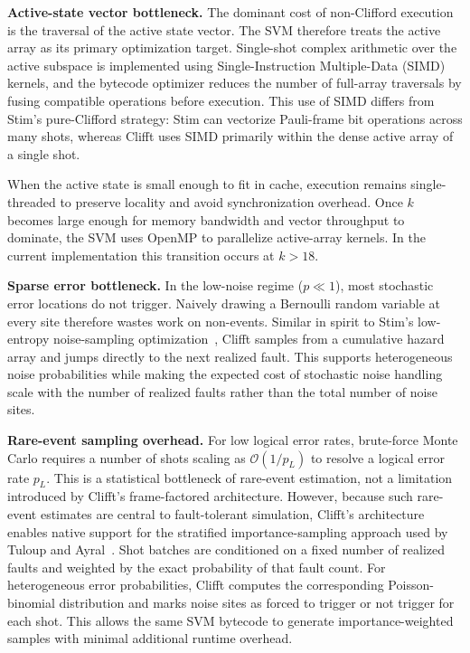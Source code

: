 \documentclass[a4paper, onecolumn, unpublished]{quantumarticle}
\begin{document}
    \textbf{Active-state vector bottleneck.}
    The dominant cost of non-Clifford execution is the traversal of the active state vector. The SVM therefore treats the active array as its primary optimization target. Single-shot complex arithmetic over the active subspace is implemented using Single-Instruction Multiple-Data (SIMD) kernels, and the bytecode optimizer reduces the number of full-array traversals by fusing compatible operations before execution. This use of SIMD differs from Stim's pure-Clifford strategy: Stim can vectorize Pauli-frame bit operations across many shots, whereas Clifft uses SIMD primarily within the dense active array of a single shot.

    When the active state is small enough to fit in cache, execution remains single-threaded to preserve locality and avoid synchronization overhead. Once $k$ becomes large enough for memory bandwidth and vector throughput to dominate, the SVM uses OpenMP to parallelize active-array kernels. In the current implementation this transition occurs at $k>18$.

    \textbf{Sparse error bottleneck.}
    In the low-noise regime ($p \ll 1$), most stochastic error locations do not trigger. Naively drawing a Bernoulli random variable at every site therefore wastes work on non-events. Similar in spirit to Stim's low-entropy noise-sampling optimization~\cite{gidneyStimFastStabilizer2021}, Clifft samples from a cumulative hazard array and jumps directly to the next realized fault. This supports heterogeneous noise probabilities while making the expected cost of stochastic noise handling scale with the number of realized faults rather than the total number of noise sites.

    \textbf{Rare-event sampling overhead.}
    For low logical error rates, brute-force Monte Carlo requires a number of shots scaling as $\mathcal{O}(1/p_L)$ to resolve a logical error rate $p_L$. This is a statistical bottleneck of rare-event estimation, not a limitation introduced by Clifft's frame-factored architecture. However, because such rare-event estimates are central to fault-tolerant simulation, Clifft's architecture enables native support for the stratified importance-sampling approach used by Tuloup and Ayral~\cite{tuloupComputingLogicalError2026a}. Shot batches are conditioned on a fixed number of realized faults and weighted by the exact probability of that fault count. For heterogeneous error probabilities, Clifft computes the corresponding Poisson-binomial distribution and marks noise sites as forced to trigger or not trigger for each shot. This allows the same SVM bytecode to generate importance-weighted samples with minimal additional runtime overhead.
\end{document}
